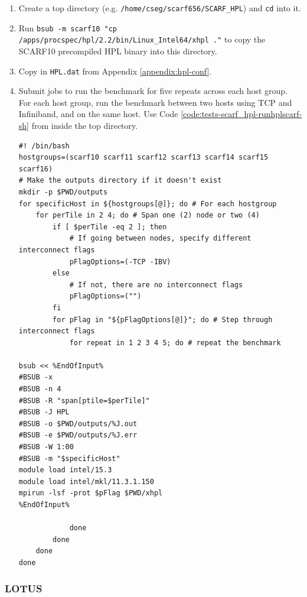 \documentclass{article}
\newenvironment{code}{\captionsetup{type=listing}}{}
\begin{document}
        \begin{enumerate}
            \item Create a top directory (e.g. \verb|/home/cseg/scarf656/SCARF_HPL|) and \verb|cd| into it.
            \item Run \texttt{bsub -m scarf10 "cp /apps/procspec/hpl/2.2/bin/Linux_Intel64/xhpl ."} to copy the SCARF10 precompiled HPL binary into this directory.
            \item Copy in \verb|HPL.dat| from Appendix \ref{appendix:hpl-conf}.
            \item Submit jobs to run the benchmark for five repeats across each host group. For each host group, run the benchmark between two hosts using TCP and Infiniband, and on the same host. Use Code \ref{code:tests-scarf_hpl-runhplscarf-sh} from inside the top directory.


            \begin{code}
            \label{code:tests-scarf_hpl-runhplscarf-sh}

            \begin{verbatim}
#! /bin/bash
hostgroups=(scarf10 scarf11 scarf12 scarf13 scarf14 scarf15 scarf16)
# Make the outputs directory if it doesn't exist
mkdir -p $PWD/outputs
for specificHost in ${hostgroups[@]}; do # For each hostgroup
    for perTile in 2 4; do # Span one (2) node or two (4)
        if [ $perTile -eq 2 ]; then
            # If going between nodes, specify different interconnect flags
            pFlagOptions=(-TCP -IBV)
        else
            # If not, there are no interconnect flags
            pFlagOptions=("")
        fi
	    for pFlag in "${pFlagOptions[@]}"; do # Step through interconnect flags
            for repeat in 1 2 3 4 5; do # repeat the benchmark

bsub << %EndOfInput%
#BSUB -x
#BSUB -n 4
#BSUB -R "span[ptile=$perTile]"
#BSUB -J HPL
#BSUB -o $PWD/outputs/%J.out
#BSUB -e $PWD/outputs/%J.err
#BSUB -W 1:00
#BSUB -m "$specificHost"
module load intel/15.3
module load intel/mkl/11.3.1.150
mpirun -lsf -prot $pFlag $PWD/xhpl
%EndOfInput%

            done
        done
    done
done
            \end{verbatim}
            \end{code}
        \end{enumerate}


        \subsubsection{LOTUS}
\end{document}
